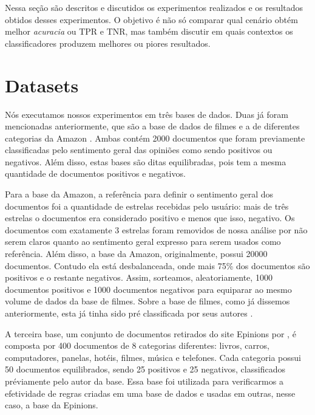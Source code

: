 \documentclass[template.tex]{subfiles}
\begin{document}

Nessa seção são descritos e discutidos os experimentos realizados e os resultados obtidos desses experimentos. O objetivo é não só comparar qual cenário obtém melhor \textit{acuracia} ou TPR e TNR, mas também discutir em quais contextos os classificadores produzem melhores ou piores resultados.

\section{Datasets}

Nós executamos nossos experimentos em três bases de dados. Duas já foram mencionadas anteriormente, que são a base de dados de filmes \cite{pang2004sentimental} e a de diferentes categorias da Amazon \cite{wang2011latent}. Ambas contém 2000 documentos que foram previamente classificadas pelo sentimento geral das opiniões como sendo positivos ou negativos. Além disso, estas bases são ditas equilibradas, pois tem a mesma quantidade de documentos positivos e negativos. 

Para a base da Amazon, a referência para definir o sentimento geral dos documentos foi a quantidade de estrelas recebidas pelo usuário: mais de três estrelas o documentos era considerado positivo e menos que isso, negativo. Os documentos com exatamente 3 estrelas foram removidos de nossa análise por não serem claros quanto ao sentimento geral expresso para serem usados como referência. Além disso, a base da Amazon, originalmente, possui 20000 documentos. Contudo ela está  desbalanceada, onde mais 75\% dos documentos são positivos e o restante negativos. Assim, sorteamos, aleatoriamente, 1000 documentos positivos e 1000 documentos negativos para equiparar ao mesmo volume de dados da base de filmes. Sobre a base de filmes, como já dissemos anteriormente, esta já tinha sido pré classificada por seus autores \cite{pang2004sentimental}.

A terceira base, um conjunto de documentos retirados do site Epinions por \cite{taboada2011lexicon}, é composta por 400 documentos de 8 categorias diferentes: livros, carros, computadores, panelas, hotéis, filmes, música e telefones. Cada categoria possui 50 documentos equilibrados, sendo 25 positivos e 25 negativos, classificados préviamente pelo autor da base. Essa base foi utilizada para verificarmos a efetividade de regras criadas em uma base de dados e usadas em outras, nesse caso, a base da Epinions. 
\end{document}
